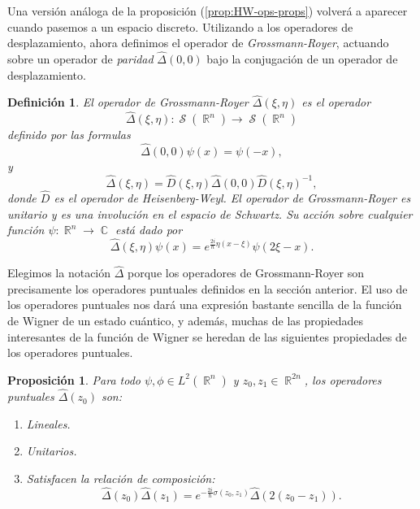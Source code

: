\documentclass[a4paper,11pt]{report}
\DeclareMathOperator{\R}{\mathbb{R}}
\DeclareMathOperator{\C}{\mathbb{C}}
\DeclareMathOperator{\Sz}{\mathcal S}
\newtheorem{definition}{Definición}
\newtheorem{proposition}{Proposición}
\begin{document}
  Una versión análoga de la proposición
  (\ref{prop:HW-ops-props}) volverá a aparecer cuando
  pasemos a un espacio discreto. Utilizando a los operadores
  de desplazamiento, ahora definimos el operador de
  \textit{Grossmann-Royer}, actuando sobre un operador de
  \textit{paridad} $\hat \Delta(0,0)$ bajo la conjugación de
  un operador de desplazamiento.
  \begin{definition}
    El operador de Grossmann-Royer $\hat{\Delta}(\xi,\eta)$
    es el operador 
    \begin{equation}
      \hat{\Delta}(\xi,\eta) : \Sz(\R^{n}) \to \Sz(\R^{n})
    \end{equation} 
    definido por las formulas 
    \begin{equation}
      \hat{\Delta}(0,0)\psi(x)
      = \psi(-x),
    \end{equation}
    y
    \begin{equation}
      \hat{\Delta}(\xi,\eta)
      = \hat{D}(\xi,\eta) \hat{\Delta}(0,0)
      \hat{D}(\xi,\eta)^{-1},
    \end{equation} 
    donde $\hat D$ es el operador de Heisenberg-Weyl. El
    operador de Grossmann-Royer es unitario y es una
    involución en el espacio de Schwartz. Su acción sobre
    cualquier función $\psi : \R^{n} \to \C$ está dado por
    \begin{equation}
      \hat{\Delta}(\xi,\eta)\psi(x)
      = e^{\frac{2i}{\hbar} \eta (x - \xi)}\psi(2\xi - x).
    \end{equation} 
  \end{definition}
  Elegimos la notación $\hat \Delta$ porque los operadores
  de Grossmann-Royer son precisamente los operadores
  puntuales definidos en la sección anterior. El uso de los
  operadores puntuales nos dará una expresión bastante
  sencilla de la función de Wigner de un estado cuántico, y
  además, muchas de las propiedades interesantes de la
  función de Wigner se heredan de las siguientes propiedades
  de los operadores puntuales.
  \begin{proposition}
    Para todo $\psi,\phi \in L^2(\R^{n})$ y $z_0,z_1 \in
    \R^{2n}$, los operadores puntuales $\hat \Delta(z_0)$
    son:
    \begin{enumerate}
      \item Lineales.
      \item Unitarios.
      \item Satisfacen la relación de composición:
        \begin{equation}
          \hat\Delta(z_0)\hat\Delta(z_1)
          = e^{-\frac{2i}{\hbar} \sigma(z_0,z_1)}
          \hat\Delta(2(z_0-z_1)).
        \end{equation}
    \end{enumerate}
  \end{proposition}
\end{document}

